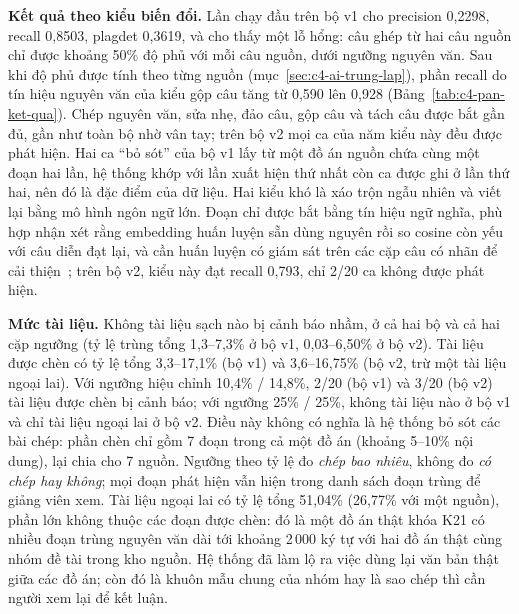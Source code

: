 \documentclass[../main.tex]{subfiles}
\begin{document}
\textbf{Kết quả theo kiểu biến đổi.} Lần chạy đầu trên bộ v1 cho precision 0,2298, recall 0,8503, plagdet 0,3619, và cho thấy một lỗ hổng: câu ghép từ hai câu nguồn chỉ được khoảng 50\% độ phủ với mỗi câu nguồn, dưới ngưỡng nguyên văn. Sau khi độ phủ được tính theo từng nguồn (mục~\ref{sec:c4-ai-trung-lap}), phần recall do tín hiệu nguyên văn của kiểu gộp câu tăng từ 0,590 lên 0,928 (Bảng~\ref{tab:c4-pan-ket-qua}). Chép nguyên văn, sửa nhẹ, đảo câu, gộp câu và tách câu được bắt gần đủ, gần như toàn bộ nhờ vân tay; trên bộ v2 mọi ca của năm kiểu này đều được phát hiện. Hai ca ``bỏ sót'' của bộ v1 lấy từ một đồ án nguồn chứa cùng một đoạn hai lần, hệ thống khớp với lần xuất hiện thứ nhất còn ca được ghi ở lần thứ hai, nên đó là đặc điểm của dữ liệu. Hai kiểu khó là xáo trộn ngẫu nhiên và viết lại bằng mô hình ngôn ngữ lớn. Đoạn  chỉ được bắt bằng tín hiệu ngữ nghĩa, phù hợp nhận xét rằng embedding huấn luyện sẵn dùng nguyên rồi so cosine còn yếu với câu diễn đạt lại, và cần huấn luyện có giám sát trên các cặp câu có nhãn để cải thiện~\cite{iqbal2025}; trên bộ v2, kiểu này đạt recall 0,793, chỉ 2/20 ca không được phát hiện.

\textbf{Mức tài liệu.} Không tài liệu sạch nào bị cảnh báo nhầm, ở cả hai bộ và cả hai cặp ngưỡng (tỷ lệ trùng tổng 1,3--7,3\% ở bộ v1, 0,03--6,50\% ở bộ v2). Tài liệu được chèn có tỷ lệ tổng 3,3--17,1\% (bộ v1) và 3,6--16,75\% (bộ v2, trừ một tài liệu ngoại lai). Với ngưỡng hiệu chỉnh 10,4\% / 14,8\%, 2/20 (bộ v1) và 3/20 (bộ v2) tài liệu được chèn bị cảnh báo; với ngưỡng 25\% / 25\%, không tài liệu nào ở bộ v1 và chỉ tài liệu ngoại lai ở bộ v2. Điều này không có nghĩa là hệ thống bỏ sót các bài chép: phần chèn chỉ gồm 7 đoạn trong cả một đồ án (khoảng 5--10\% nội dung), lại chia cho 7 nguồn. Ngưỡng theo tỷ lệ đo \textit{chép bao nhiêu}, không đo \textit{có chép hay không}; mọi đoạn phát hiện vẫn hiện trong danh sách đoạn trùng để giảng viên xem. Tài liệu ngoại lai có tỷ lệ tổng 51,04\% (26,77\% với một nguồn), phần lớn không thuộc các đoạn được chèn: đó là một đồ án thật khóa K21 có nhiều đoạn trùng nguyên văn dài tới khoảng 2\,000 ký tự với hai đồ án thật cùng nhóm đề tài trong kho nguồn. Hệ thống đã làm lộ ra việc dùng lại văn bản thật giữa các đồ án; còn đó là khuôn mẫu chung của nhóm hay là sao chép thì cần người xem lại để kết luận.
\end{document}
